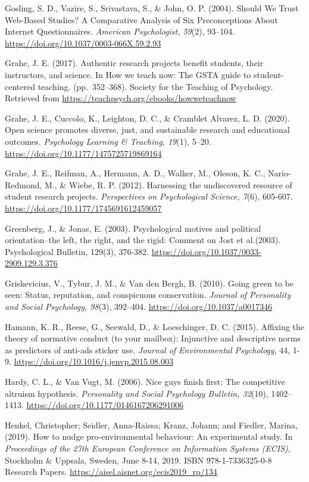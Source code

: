 \documentclass[
]{article}
\begin{document}
Gosling, S. D., Vazire, S., Srivastava, S., \& John, O. P. (2004).
Should We Trust Web-Based Studies? A Comparative Analysis of Six
Preconceptions About Internet Questionnaires. \emph{American
Psychologist, 59}(2), 93--104.
\url{https://doi.org/10.1037/0003-066X.59.2.93}

Grahe, J. E. (2017). Authentic research projects benefit students, their
instructors, and science. In How we teach now: The GSTA guide to
student-centered teaching. (pp.~352--368). Society for the Teaching of
Psychology. Retrieved from
\url{https://teachpsych.org/ebooks/howweteachnow}

Grahe, J. E., Cuccolo, K., Leighton, D. C., \& Cramblet Alvarez, L. D.
(2020). Open science promotes diverse, just, and sustainable research
and educational outcomes. \emph{Psychology Learning \& Teaching, 19}(1),
5--20. \url{https://doi.org/10.1177/1475725719869164}

Grahe, J. E., Reifman, A., Hermann, A. D., Walker, M., Oleson, K. C.,
Nario-Redmond, M., \& Wiebe, R. P. (2012). Harnessing the undiscovered
resource of student research projects. \emph{Perspectives on
Psychological Science, 7}(6), 605-607.
\url{https://doi.org/10.1177/1745691612459057}

Greenberg, J., \& Jonas, E. (2003). Psychological motives and political
orientation--the left, the right, and the rigid: Comment on Jost et
al.(2003). Psychological Bulletin, 129(3), 376-382.
\url{https://doi.org/10.1037/0033-2909.129.3.376}

Griskevicius, V., Tybur, J. M., \& Van den Bergh, B. (2010). Going green
to be seen: Status, reputation, and conspicuous conservation.
\emph{Journal of Personality and Social Psychology, 98}(3), 392--404.
\url{https://doi.org/10.1037/a0017346}

Hamann, K. R., Reese, G., Seewald, D., \& Loeschinger, D. C. (2015).
Affixing the theory of normative conduct (to your mailbox): Injunctive
and descriptive norms as predictors of anti-ads sticker use.
\emph{Journal of Environmental Psychology}, 44, 1-9.
\url{https://doi.org/10.1016/j.jenvp.2015.08.003}

Hardy, C. L., \& Van Vugt, M. (2006). Nice guys finish first: The
competitive altruism hypothesis. \emph{Personality and Social Psychology
Bulletin, 32}(10), 1402--1413.
\url{https://doi.org/10.1177/0146167206291006}

Henkel, Christopher; Seidler, Anna-Raissa; Kranz, Johann; and Fiedler,
Marina, (2019). How to nudge pro-environmental behaviour: An
experimental study. In \emph{Proceedings of the 27th European Conference
on Information Systems (ECIS)}, Stockholm \& Uppsala, Sweden, June 8-14,
2019. ISBN 978-1-7336325-0-8 Research Papers.
\url{https://aisel.aisnet.org/ecis2019_rp/134}
\end{document}
